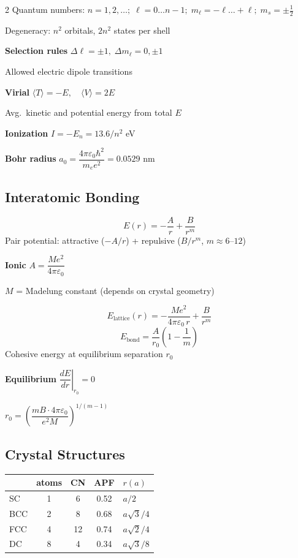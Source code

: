 \documentclass[9pt]{extarticle}
\newcommand{\eqlabel}[1]{\textbf{\scriptsize #1}\;}
\newcommand{\desc}[1]{{\small\color{desc}#1}}
\begin{document}
\begin{multicols}{2}
Quantum numbers: $n=1,2,\ldots;\; \ell=0\ldots n\!-\!1;\; m_\ell=-\ell\ldots+\ell;\; m_s=\pm\tfrac{1}{2}$

Degeneracy: $n^2$ orbitals, $2n^2$ states per shell

\eqlabel{Selection rules} $\Delta\ell=\pm1,\;\Delta m_\ell=0,\pm1$

\desc{Allowed electric dipole transitions}

\eqlabel{Virial} $\langle T \rangle = -E,\quad \langle V \rangle = 2E$

\desc{Avg.\ kinetic and potential energy from total $E$}

\eqlabel{Ionization} $I = -E_n = 13.6/n^2$ eV

\eqlabel{Bohr radius} $a_0 = \dfrac{4\pi\varepsilon_0\hbar^2}{m_e e^2} = 0.0529$ nm


\subsection{Interatomic Bonding}
\[E(r) = -\frac{A}{r} + \frac{B}{r^m}\]
\desc{Pair potential: attractive ($-A/r$) + repulsive ($B/r^m$, $m \approx 6$--$12$)}

\eqlabel{Ionic} $A = \dfrac{Me^2}{4\pi\varepsilon_0}$

\desc{$M$ = Madelung constant (depends on crystal geometry)}

\[E_{\text{lattice}}(r) = -\frac{Me^2}{4\pi\varepsilon_0\,r} + \frac{B}{r^m}\]
\[E_{\text{bond}} = \frac{A}{r_0}\left(1 - \frac{1}{m}\right)\]
\desc{Cohesive energy at equilibrium separation $r_0$}

\eqlabel{Equilibrium} $\left.\dfrac{dE}{dr}\right|_{r_0}=0$

$r_0 = \left(\dfrac{mB\cdot 4\pi\varepsilon_0}{e^2 M}\right)^{1/(m-1)}$

\subsection{Crystal Structures}
\renewcommand{\arraystretch}{1.15}
\begin{tabular}{@{}l c c c l@{}}
\toprule
& \small atoms & \small CN & \small APF & \small $r(a)$ \\
\midrule
SC & 1 & 6 & 0.52 & $a/2$ \\
BCC & 2 & 8 & 0.68 & $a\sqrt{3}/4$ \\
FCC & 4 & 12 & 0.74 & $a\sqrt{2}/4$ \\
DC & 8 & 4 & 0.34 & $a\sqrt{3}/8$ \\
\bottomrule
\end{tabular}
\renewcommand{\arraystretch}{1.0}


\end{multicols}
\end{document}
